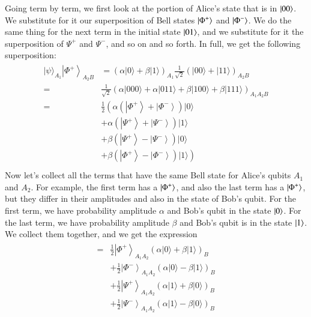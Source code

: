 Going term by term, we first look at the portion of Alice's state that is in $\left| 00 \right\rangle$.
We substitute for it our superposition of Bell states $\left| \Phi^+ \right\rangle$ and $\left| \Phi^- \right\rangle$. We do the same thing for the next term in the initial state $\left| 01 \right\rangle$, and we substitute for it the superposition of $\Psi^+$ and $\Psi^-$, and so on and so forth. In full, we get the following superposition:
\begin{align}
    \begin{aligned}
        |\psi\rangle_{A_{1}}\left|\Phi^{+}\right\rangle_{A_{2} B} &=(\alpha|0\rangle+\beta|1\rangle)_{A_{1}} \frac{1}{\sqrt{2}}(|00\rangle+|11\rangle)_{A_{2} B} \\
        =&\frac{1}{\sqrt{2}}(\alpha|000\rangle+\alpha|011\rangle+\beta|100\rangle+\beta|111\rangle)_{A_{1} A_{2} B} \\
        =& \frac{1}{2}\left(\alpha\left(\left|\Phi^{+}\right\rangle+\left|\Phi^{-}\right\rangle\right)|0\rangle\right.\\
        &+\alpha\left(\left|\Psi^{+}\right\rangle+\left|\Psi^{-}\right\rangle\right)|1\rangle \\
        &+\beta\left(\left|\Psi^{+}\right\rangle-\left|\Psi^{-}\right\rangle\right)|0\rangle \\
        &\left.+\beta\left(\left|\Phi^{+}\right\rangle-\left|\Phi^{-}\right\rangle\right)|1\rangle\right) \\
\end{aligned}
\end{align}
Now let's collect all the terms that have the same Bell state for Alice's qubits $A_1$ and $A_2$. For example, the first term has a $\left| \Phi^+ \right\rangle$, and also the last term has a $\left| \Phi^+ \right\rangle$, but they differ in their amplitudes and also in the state of Bob's qubit. For the first term, we have probability amplitude $\alpha$ and Bob's qubit in the state $\left| 0 \right\rangle$. For the last term, we have probability amplitude $\beta$ and Bob's qubit is in the state $\left| 1 \right\rangle$. We collect them together, and we get the expression
\begin{align}
    \begin{aligned}
=&\frac{1}{2}\left|\Phi^{+}\right\rangle_{A_{1} A_{2}}(\alpha|0\rangle+\beta|1\rangle)_{B} \\
&+\frac{1}{2}\left|\Phi^{-}\right\rangle_{A_{1} A_{2}}(\alpha|0\rangle-\beta|1\rangle)_{B} \\
&+\frac{1}{2}\left|\Psi^{+}\right\rangle_{A_{1} A_{2}}(\alpha|1\rangle+\beta|0\rangle)_{B} \\
&+\frac{1}{2}\left|\Psi^{-}\right\rangle_{A_{1} A_{2}}(\alpha|1\rangle-\beta|0\rangle)_{B}
\end{aligned}
\label{eq:teleport-alice-basis}
\end{align}


